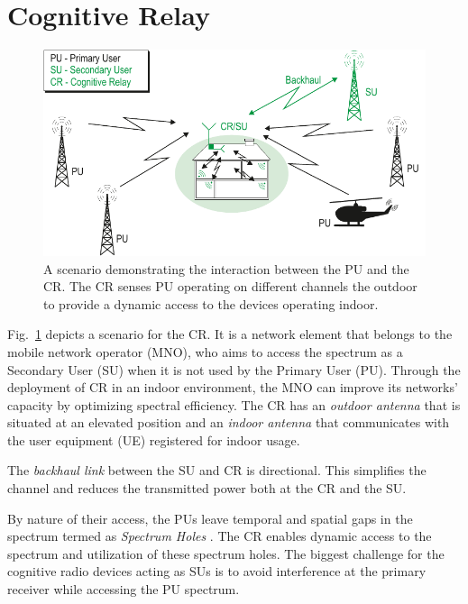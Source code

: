 \documentclass[conference,a4paper]{IEEEtran}
\begin{document}
\section{Cognitive Relay} \label{sec:scenario}
\begin{figure}[!t]
	\centering
	\includegraphics[scale=.62]{figures/wo_channels_CR_Scenario_farbig}
	\caption{A scenario demonstrating the interaction between the PU and the CR. The CR senses PU operating on different channels the outdoor to provide a dynamic access to the devices operating indoor.}
	\label{fig:scenario}
\end{figure}
Fig.~\ref{fig:scenario} depicts a scenario for the CR. It
is a network element that belongs to the mobile network operator (MNO), who
aims to access the spectrum as a Secondary User (SU) when it is not used by the
Primary User (PU). Through the deployment of CR in an indoor environment,
the MNO can improve its networks' capacity by optimizing spectral efficiency.
The CR has an \textit{outdoor antenna}
that is situated at an elevated position and an
\textit{indoor antenna} that communicates with the user equipment (UE)
registered for indoor usage.

The \textit{backhaul link} between the SU and CR
is directional. This simplifies the channel and reduces the transmitted power
both at the CR and the SU.

By nature of their access, the PUs leave temporal and spatial gaps in the spectrum termed as \textit{Spectrum Holes} \cite{Weiss}.
The CR enables dynamic access to the spectrum and utilization of these spectrum holes.
The biggest challenge for the cognitive radio devices acting as SUs is to avoid interference at the primary receiver while accessing the PU spectrum.
\end{document}
